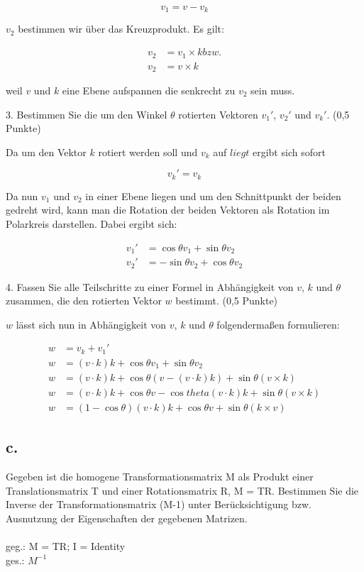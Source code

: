 \documentclass[12pt]{scrreprt}
\begin{document}
\[
v_1 = v - v_k
\]

$v_2$ bestimmen wir über das Kreuzprodukt. Es gilt:

\begin{align*}
	v_2 &= v_1 \times k bzw.\\
	v_2 &= v \times k
\end{align*}

weil $v$ und $k$ eine Ebene aufspannen die senkrecht zu $v_2$ sein muss.

3. Bestimmen Sie die um den Winkel $\theta$ rotierten Vektoren $v_1'$, $v_2'$ und $v_k'$. (0,5 Punkte)

Da um den Vektor $k$ rotiert werden soll und $v_k$ auf $liegt$ ergibt sich sofort

\[
	v_k' = v_k
\]

Da nun $v_1$ und $v_2$ in einer Ebene liegen und um den Schnittpunkt der beiden gedreht wird, kann man die Rotation der beiden Vektoren als Rotation im Polarkreis darstellen. Dabei ergibt sich:

\begin{align*}
	v_1' &= \cos{\theta} v_1 + \sin{\theta} v_2\\
	v_2' &= -\sin{\theta} v_2 + \cos{\theta} v_2
\end{align*}

4. Fassen Sie alle Teilschritte zu einer Formel in Abhängigkeit von $v$, $k$ und $\theta$ zusammen, die den
rotierten Vektor $w$ bestimmt. (0,5 Punkte)

$w$ lässt sich nun in Abhängigkeit von $v$, $k$ und $\theta$ folgendermaßen formulieren:

\begin{align*}
	w &= v_k + v_1'\\
	w &= (v \cdot k)k + \cos{\theta} v_1 + \sin{\theta} v_2\\
	w &= (v \cdot k)k + \cos{\theta} (v - (v \cdot k)k) + \sin{\theta} (v \times k)\\
	w &= (v \cdot k)k + \cos{\theta}v - \cos{theta}(v \cdot k)k + \sin{\theta}(v \times k)\\
	w &= (1 - \cos{\theta})(v \cdot k)k + \cos{\theta}v + \sin{\theta}(k \times v)
\end{align*}

\subsection*{c.}

Gegeben ist die homogene Transformationsmatrix M als Produkt einer Translationsmatrix T und einer
Rotationsmatrix R, M = TR. Bestimmen Sie die Inverse der Transformationsmatrix (M-1) unter
Berücksichtigung bzw. Ausnutzung der Eigenschaften der gegebenen Matrizen.\\
\\
geg.: M = TR; I = Identity\\
ges.: $M^{-1}$ \\
\end{document}
